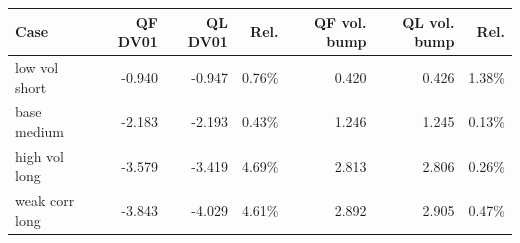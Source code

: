 \begin{tabular}{lrrrrrr}
\toprule
Case & QF DV01 & QL DV01 & Rel. & QF vol. bump & QL vol. bump & Rel. \\
\midrule
low vol short & -0.940 & -0.947 & 0.76\% & 0.420 & 0.426 & 1.38\% \\
base medium & -2.183 & -2.193 & 0.43\% & 1.246 & 1.245 & 0.13\% \\
high vol long & -3.579 & -3.419 & 4.69\% & 2.813 & 2.806 & 0.26\% \\
weak corr long & -3.843 & -4.029 & 4.61\% & 2.892 & 2.905 & 0.47\% \\
\bottomrule
\end{tabular}
